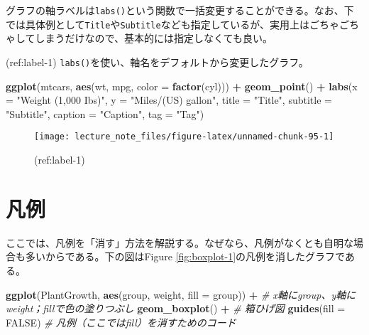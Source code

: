 \documentclass[]{book}
\newenvironment{Shaded}{\begin{snugshade}}{\end{snugshade}}
\newcommand{\KeywordTok}[1]{\textcolor[rgb]{0.13,0.29,0.53}{\textbf{#1}}}
\newcommand{\DataTypeTok}[1]{\textcolor[rgb]{0.13,0.29,0.53}{#1}}
\newcommand{\StringTok}[1]{\textcolor[rgb]{0.31,0.60,0.02}{#1}}
\newcommand{\CommentTok}[1]{\textcolor[rgb]{0.56,0.35,0.01}{\textit{#1}}}
\newcommand{\OtherTok}[1]{\textcolor[rgb]{0.56,0.35,0.01}{#1}}
\newcommand{\OperatorTok}[1]{\textcolor[rgb]{0.81,0.36,0.00}{\textbf{#1}}}
\newcommand{\NormalTok}[1]{#1}
\begin{document}
グラフの軸ラベルは\texttt{labs()}という関数で一括変更することができる。なお、下では具体例として\texttt{Title}や\texttt{Subtitle}なども指定しているが、実用上はごちゃごちゃしてしまうだけなので、基本的には指定しなくても良い。

(ref:label-1)
\texttt{labs()}を使い、軸名をデフォルトから変更したグラフ。

\begin{Shaded}
\begin{Highlighting}[]
\KeywordTok{ggplot}\NormalTok{(mtcars, }\KeywordTok{aes}\NormalTok{(wt, mpg, }\DataTypeTok{color =} \KeywordTok{factor}\NormalTok{(cyl))) }\OperatorTok{+}
\StringTok{  }\KeywordTok{geom_point}\NormalTok{() }\OperatorTok{+}
\StringTok{  }\KeywordTok{labs}\NormalTok{(}\DataTypeTok{x =} \StringTok{"Weight (1,000 Ibs)"}\NormalTok{,}
       \DataTypeTok{y =} \StringTok{"Miles/(US) gallon"}\NormalTok{,}
       \DataTypeTok{title =} \StringTok{"Title"}\NormalTok{,}
       \DataTypeTok{subtitle =} \StringTok{"Subtitle"}\NormalTok{,}
       \DataTypeTok{caption =} \StringTok{"Caption"}\NormalTok{,}
       \DataTypeTok{tag =} \StringTok{"Tag"}\NormalTok{)}
\end{Highlighting}
\end{Shaded}

\begin{figure}

{\centering \texttt{[image: lecture\_note\_files/figure-latex/unnamed-chunk-95-1]} 

}

\caption{(ref:label-1)}\label{fig:unnamed-chunk-95}
\end{figure}

\section{凡例}

ここでは、凡例を「消す」方法を解説する。なぜなら、凡例がなくとも自明な場合も多いからである。下の図はFigure
\ref{fig:boxplot-1}の凡例を消したグラフである。



\begin{Shaded}
\begin{Highlighting}[]
\KeywordTok{ggplot}\NormalTok{(PlantGrowth, }\KeywordTok{aes}\NormalTok{(group, weight, }\DataTypeTok{fill =}\NormalTok{ group)) }\OperatorTok{+}\StringTok{ }\CommentTok{# x軸にgroup、y軸にweight；fillで色の塗りつぶし}
\StringTok{  }\KeywordTok{geom_boxplot}\NormalTok{() }\OperatorTok{+}\StringTok{ }\CommentTok{# 箱ひげ図}
\StringTok{  }\KeywordTok{guides}\NormalTok{(}\DataTypeTok{fill =} \OtherTok{FALSE}\NormalTok{) }\CommentTok{# 凡例（ここではfill）を消すためのコード}
\end{Highlighting}
\end{Shaded}
\end{document}
